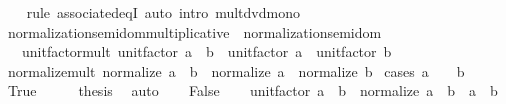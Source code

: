 \begin{isabellebody}
%
\isadelimproof
\ \ %
\endisadelimproof
%
\isatagproof
{}\isamarkupfalse%
\ {\isacharparenleft}{\kern0pt}rule\ associated{\isacharunderscore}{\kern0pt}eqI{\isacharparenright}{\kern0pt}\ {\isacharparenleft}{\kern0pt}auto\ intro{\isacharbang}{\kern0pt}{\isacharcolon}{\kern0pt}\ mult{\isacharunderscore}{\kern0pt}dvd{\isacharunderscore}{\kern0pt}mono{\isacharparenright}{\kern0pt}%
\endisatagproof
{\isafoldproof}%
%
\isadelimproof
\isanewline
%
\endisadelimproof
\isanewline
{}\isamarkupfalse%
\isanewline
\isanewline
\isanewline
{}\isamarkupfalse%
\ normalization{\isacharunderscore}{\kern0pt}semidom{\isacharunderscore}{\kern0pt}multiplicative\ {\isacharequal}{\kern0pt}\ normalization{\isacharunderscore}{\kern0pt}semidom\ {\isacharplus}{\kern0pt}\isanewline
\ \ \ unit{\isacharunderscore}{\kern0pt}factor{\isacharunderscore}{\kern0pt}mult{\isacharcolon}{\kern0pt}\ {\isachardoublequoteopen}unit{\isacharunderscore}{\kern0pt}factor\ {\isacharparenleft}{\kern0pt}a\ {\isacharasterisk}{\kern0pt}\ b{\isacharparenright}{\kern0pt}\ {\isacharequal}{\kern0pt}\ unit{\isacharunderscore}{\kern0pt}factor\ a\ {\isacharasterisk}{\kern0pt}\ unit{\isacharunderscore}{\kern0pt}factor\ b{\isachardoublequoteclose}\isanewline
{}\isanewline
\isanewline
{}\isamarkupfalse%
\ normalize{\isacharunderscore}{\kern0pt}mult{\isacharcolon}{\kern0pt}\ {\isachardoublequoteopen}normalize\ {\isacharparenleft}{\kern0pt}a\ {\isacharasterisk}{\kern0pt}\ b{\isacharparenright}{\kern0pt}\ {\isacharequal}{\kern0pt}\ normalize\ a\ {\isacharasterisk}{\kern0pt}\ normalize\ b{\isachardoublequoteclose}\isanewline
%
\isadelimproof
%
\endisadelimproof
%
\isatagproof
{}\isamarkupfalse%
\ {\isacharparenleft}{\kern0pt}cases\ {\isachardoublequoteopen}a\ {\isacharequal}{\kern0pt}\ {}\ {\isasymor}\ b\ {\isacharequal}{\kern0pt}\ {}{\isachardoublequoteclose}{\isacharparenright}{\kern0pt}\isanewline
\ \ \isamarkupfalse%
\ True\isanewline
\ \ \isamarkupfalse%
\ \isamarkupfalse%
\ {\isacharquery}{\kern0pt}thesis\ \isamarkupfalse%
\ auto\isanewline
{}\isamarkupfalse%
\isanewline
\ \ \isamarkupfalse%
\ False\isanewline
\ \ \isamarkupfalse%
\ {\isachardoublequoteopen}unit{\isacharunderscore}{\kern0pt}factor\ {\isacharparenleft}{\kern0pt}a\ {\isacharasterisk}{\kern0pt}\ b{\isacharparenright}{\kern0pt}\ {\isacharasterisk}{\kern0pt}\ normalize\ {\isacharparenleft}{\kern0pt}a\ {\isacharasterisk}{\kern0pt}\ b{\isacharparenright}{\kern0pt}\ {\isacharequal}{\kern0pt}\ a\ {\isacharasterisk}{\kern0pt}\ b{\isachardoublequoteclose}\isanewline

\end{isabellebody}
